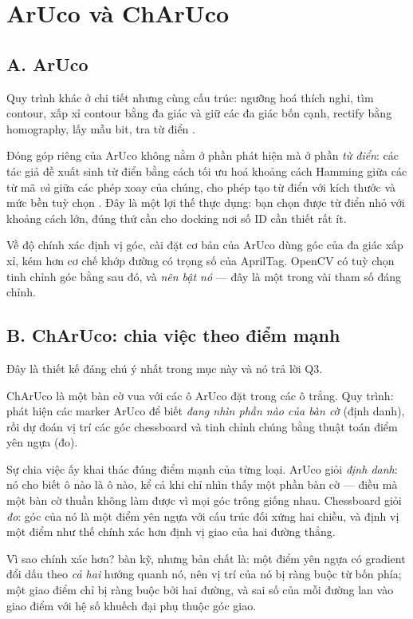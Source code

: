 \documentclass[../../marker.tex]{subfiles}
\begin{document}
\section{ArUco và ChArUco}

\subsection{A. ArUco}

Quy trình khác ở chi tiết nhưng cùng cấu trúc: ngưỡng hoá thích nghi, tìm contour, xấp xỉ contour bằng đa giác và giữ các đa giác bốn cạnh, rectify bằng homography, lấy mẫu bit, tra từ điển \cite{garrido2014automatic}.

Đóng góp riêng của ArUco không nằm ở phần phát hiện mà ở phần \emph{từ điển}: các tác giả đề xuất sinh từ điển bằng cách tối ưu hoá khoảng cách Hamming giữa các từ mã \emph{và} giữa các phép xoay của chúng, cho phép tạo từ điển với kích thước và mức bền tuỳ chọn \cite{garrido2016generation}. Đây là một lợi thế thực dụng: bạn chọn được từ điển nhỏ với khoảng cách lớn, đúng thứ cần cho docking nơi số ID cần thiết rất ít.

Về độ chính xác định vị góc, cài đặt cơ bản của ArUco dùng góc của đa giác xấp xỉ, kém hơn cơ chế khớp đường có trọng số của AprilTag. OpenCV có tuỳ chọn tinh chỉnh góc bằng  sau đó, và \emph{nên bật nó} --- đây là một trong vài tham số đáng chỉnh.

\subsection{B. ChArUco: chia việc theo điểm mạnh}

Đây là thiết kế đáng chú ý nhất trong mục này và nó trả lời Q3.

ChArUco là một bàn cờ vua với các ô ArUco đặt trong các ô trắng. Quy trình: phát hiện các marker ArUco để biết \emph{đang nhìn phần nào của bàn cờ} (định danh), rồi dự đoán vị trí các góc chessboard và tinh chỉnh chúng bằng thuật toán điểm yên ngựa (đo).

Sự chia việc ấy khai thác đúng điểm mạnh của từng loại. ArUco giỏi \emph{định danh}: nó cho biết ô nào là ô nào, kể cả khi chỉ nhìn thấy một phần bàn cờ --- điều mà một bàn cờ thuần không làm được vì mọi góc trông giống nhau. Chessboard giỏi \emph{đo}: góc của nó là một điểm yên ngựa với cấu trúc đối xứng hai chiều, và định vị một điểm như thế chính xác hơn định vị giao của hai đường thẳng.

Vì sao chính xác hơn?  bàn kỹ, nhưng bản chất là: một điểm yên ngựa có gradient đổi dấu theo \emph{cả hai} hướng quanh nó, nên vị trí của nó bị ràng buộc từ bốn phía; một giao điểm chỉ bị ràng buộc bởi hai đường, và sai số của mỗi đường lan vào giao điểm với hệ số khuếch đại phụ thuộc góc giao.
\end{document}
